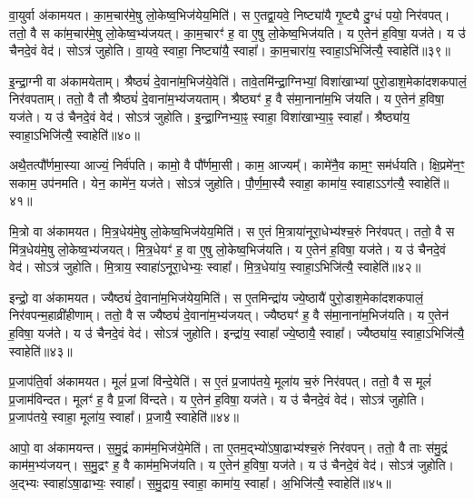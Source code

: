 वा॒युर्वा अ॑कामयत।
का॒म॒चार॑मे॒षु लो॒केष्व॒भिज॑येय॒मिति॑।
स ए॒तद्वा॒यवे॒ निष्ट्या॑यै गृ॒ष्ट्यै दु॒ग्धं पयो॒ निर॑वपत्।
ततो॒ वै स का॑म॒चार॑मे॒षु लो॒केष्व॒भ्य॑जयत्।
का॒म॒चारꣳ॑ ह॒ वा ए॒षु लो॒केष्व॒भि\-ज॑यति।
य ए॒तेन॑ ह॒विषा॒ यज॑ते।
य उ॑ चैनदे॒वं वेद॑।
सोऽत्र॑ जुहोति।
वा॒यवे॒ स्वाहा॒ निष्ट्या॑यै॒ स्वाहा᳚।
का॒म॒चारा॑य॒ स्वाहा॒\-ऽभिजि॑त्यै॒ स्वाहेति॑॥३९॥\ip

इ॒न्द्रा॒ग्नी वा अ॑कामयेताम्।
श्रैष्ठ्यं॑ दे॒वाना॑म॒भिज॑ये॒वेति॑।
तावे॒तमि॑न्द्रा॒ग्निभ्यां॒ विशा॑खाभ्यां पुरो॒डाश॒मेका॑\-दश\-कपालं॒ निर॑वपताम्।
ततो॒ वै तौ श्रैष्ठ्यं॑ दे॒वाना॑म॒भ्य॑जयताम्।
श्रैष्ठ्यꣳ॑ ह॒ वै स॑मा॒नाना॑म॒भि ज॑यति।
य ए॒तेन॑ ह॒विषा॒ यज॑ते।
य उ॑ चैनदे॒वं वेद॑।
सोऽत्र॑ जुहोति।
इ॒न्द्रा॒ग्निभ्या॒ꣴ॒ स्वाहा॒ विशा॑खाभ्या॒ꣴ॒ स्वाहा᳚।
श्रैष्ठ्या॑य॒ स्वाहा॒\-ऽभिजि॑त्यै॒ स्वाहेति॑॥४०॥\ip

अथै॒तत्पौ᳚र्णमा॒स्या आज्यं॒ निर्व॑पति।
कामो॒ वै पौ᳚र्णमा॒सी।
काम॒ आज्यम्᳚।
कामे॑नै॒व काम॒ꣳ॒ सम॑र्धयति।
क्षि॒प्रमे॑न॒ꣳ॒ सकाम॒ उप॑नमति।
येन॒ कामे॑न॒ यज॑ते।
सोऽत्र॑ जुहोति।
पौ॒र्ण॒मा॒स्यै स्वाहा॒ कामा॑य॒ स्वाहा\-ऽऽग॑त्यै॒ स्वाहेति॑॥४१॥\ip\anuvakamend[अ॒ग्निः पञ्च॑दश प्र॒जा\-प॑तिः॒ षोड॑श॒ सोम॒ एका॑दश रु॒द्रो दश॒र्क्षैका॑दश॒ बृह॒स्पति॒र्दश॑ देवासु॒रा नव॑ पि॒तर॒ एका॑दशार्य॒मा भगो॒ दश॑ दश सवि॒ता चतु॑र्दश॒ त्वष्टा॑ वा॒युरि॑न्द्रा॒ग्नी दश॑ द॒शाथै॒तत्पौ᳚र्णमा॒स्या अ॒ष्टौ पञ्च॑दश]

मि॒त्रो वा अ॑कामयत।
मि॒त्र॒धेय॑मे॒षु लो॒केष्व॒भिज॑येय॒मिति॑।
स ए॒तं मि॒त्राया॑नूरा॒धेभ्य॑श्च॒रुं निर॑वपत्।
ततो॒ वै स मि॑त्र॒धेय॑मे॒षु लो॒केष्व॒भ्य॑जयत्।
मि॒त्र॒धेयꣳ॑ ह॒ वा ए॒षु लो॒केष्व॒भि\-ज॑यति।
य ए॒तेन॑ ह॒विषा॒ यज॑ते।
य उ॑ चैनदे॒वं वेद॑।
सोऽत्र॑ जुहोति।
मि॒त्राय॒ स्वाहा॑\-ऽनूरा॒धेभ्यः॒ स्वाहा᳚।
मि॒त्र॒धेया॑य॒ स्वाहा॒\-ऽभिजि॑त्यै॒ स्वाहेति॑॥४२॥\ip

इन्द्रो॒ वा अ॑कामयत।
ज्यैष्ठ्यं॑ दे॒वाना॑म॒भिज॑येय॒मिति॑।
स ए॒तमिन्द्रा॑य ज्ये॒ष्ठायै॑ पुरो॒डाश॒मेका॑\-दश\-कपालं॒ निर॑वपन्म॒हाव्री॑हीणाम्।
ततो॒ वै स ज्यैष्ठ्यं॑ दे॒वाना॑म॒भ्य॑जयत्।
ज्यैष्ठ्यꣳ॑ ह॒ वै स॑मा॒नाना॑म॒भि\-ज॑यति।
य ए॒तेन॑ ह॒विषा॒ यज॑ते।
य उ॑ चैनदे॒वं वेद॑।
सोऽत्र॑ जुहोति।
इन्द्रा॑य॒ स्वाहा᳚ ज्ये॒ष्ठायै॒ स्वाहा᳚।
ज्यैष्ठ्या॑य॒ स्वाहा॒ऽभिजि॑त्यै॒ स्वाहेति॑॥४३॥\ip

प्र॒जा\-प॑ति॒र्वा अ॑कामयत।
मूलं॑ प्र॒जां वि॑न्दे॒येति॑।
स ए॒तं प्र॒जा\-प॑तये॒ मूला॑य च॒रुं निर॑वपत्।
ततो॒ वै स मूलं॑ प्र॒जाम॑विन्दत।
मूलꣳ॑ ह॒ वै प्र॒जां वि॑न्दते।
य ए॒तेन॑ ह॒विषा॒ यज॑ते।
य उ॑ चैनदे॒वं वेद॑।
सोऽत्र॑ जुहोति।
प्र॒जा\-प॑तये॒ स्वाहा॒ मूला॑य॒ स्वाहा᳚।
प्र॒जायै॒ स्वाहेति॑॥४४॥\ip

आपो॒ वा अ॑कामयन्त।
स॒मु॒द्रं काम॑म॒भिज॑ये॒मेति॑।
ता ए॒तम॒द्भ्यो॑\-ऽषा॒ढाभ्य॑श्च॒रुं निर॑वपन्।
ततो॒ वै ताः स॑मु॒द्रं काम॑म॒भ्य॑जयन्।
स॒मु॒द्रꣳ ह॒ वै काम॑म॒भि\-ज॑यति।
य ए॒तेन॑ ह॒विषा॒ यज॑ते।
य उ॑ चैनदे॒वं वेद॑।
सोऽत्र॑ जुहोति।
अ॒द्भ्यः स्वाहा॑\-ऽषा॒ढाभ्यः॒ स्वाहा᳚।
स॒मु॒द्राय॒ स्वाहा॒ कामा॑य॒ स्वाहा᳚।
अ॒भिजि॑त्यै॒ स्वाहेति॑॥४५॥\ip

